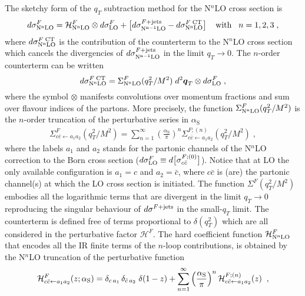 \documentclass[12pt]{article}
\def\beeq{\begin{eqnarray}}
\def\eeeq{\end{eqnarray}}
\def\bom#1{{\mbox{\boldmath $#1$}}}
\newcommand\as{\alpha_{\mathrm{S}}}
\def\ito{\leftarrow}
\def\qt{q_T}
\begin{document}
The sketchy form of the $\qt$ subtraction method \cite{Catani:2007vq} for the N$^{n}$LO cross section is
 \begin{equation}
 \label{masterEqqT}
 d\sigma^{F}_{\rm N^{n}LO} = \mathcal{H}^{F}_{\rm N^{n}LO} \otimes d\sigma^{F}_{\rm LO} + \big[ d\sigma^{F+{\rm jets}}_{\rm N^{n-1}LO} -  d\sigma^{F\;{\rm CT}}_{\rm N^{n}LO} \big]\;\;\;\;{\rm with}\;\;\; n=1,2,3\;,
 \end{equation}
where $d\sigma^{F\;{\rm CT}}_{\rm N^{n}LO}$ is the contribution of the counterterm to the N$^{n}$LO cross section which cancels the divergencies of $d\sigma^{F+{\rm jets}}_{\rm N^{n-1}LO}$ in the limit $\qt \rightarrow 0$. The $n$-order counterterm can be written
\begin{equation}
  d\sigma^{F\;{\rm CT}}_{\rm N^{n}LO} =   \Sigma^{F}_{\rm N^{n}LO}(\qt^{2}/M^{2})\;d^{2}\bom{q}_{T}   \otimes d\sigma^{F}_{\rm LO}\;,
\end{equation}
where the symbol $ \otimes$ manifests convolutions over momentum fractions and sum over flavour indices of the partons.
More precisely, the function $\Sigma^{F}_{\rm N^{n}LO}(\qt^{2}/M^{2})$ is the $n$-order truncation of the perturbative series in $\as$
\beeq
\Sigma^{F}_{c\bar{c}\leftarrow a_{1}a_{2}}(\qt^{2}/M^{2}) =  \sum_{n=1}^\infty \left( \frac{\as}{\pi} \right)^n \Sigma^{F;(n)}_{c\bar{c}\leftarrow a_{1}a_{2}}(\qt^{2}/M^{2})\;,
\eeeq
where the labels $a_{1}$ and $a_{2}$ stands for the partonic channels of the N$^{n}$LO correction to the Born cross section ($d\sigma^{F}_{\rm LO}\equiv d\big[\sigma^{F;(0)}_{c\bar{c}}\big]$). Notice that at LO the only available configuration is $a_{1}=c$ and $a_{2}=\bar{c}$, where $c\bar{c}$ is (are) the partonic channel(s) at which the LO cross section is initiated.
The function $ \Sigma^{F}(\qt^{2}/M^{2})$ embodies all the logarithmic terms that are divergent in the limit $\qt \rightarrow 0$ reproducing the singular behaviour of  $d\sigma^{F+{\rm jets}}$ in the small-$\qt$ limit. The counterterm is defined free of terms proportional to $\delta(\qt^{2})$ which are all considered in the perturbative factor $\mathcal{H}^{F}$. The hard coefficient function $\mathcal{H}^{F}_{\rm N^{n}LO}$  that encodes all the IR finite terms of the $n$-loop contributions, is obtained by the N$^{n}$LO truncation of the perturbative function
\begin{equation}
\label{Hstexpand}
{\cal H}^F_{c\bar{c}\ito a_{1}a_{2}}(z;\as) =\delta_{c\,a_{1}} \,\delta_{\bar{c}\,a_{2}}\;\delta(1-z)+
\sum_{n=1}^{\infty}\left(\frac{\as}{\pi}\right)^n 
{\cal H}^{F;(n)}_{c\bar{c}\ito a_{1}a_{2}}(z) \;\; ,
\end{equation}
\end{document}
